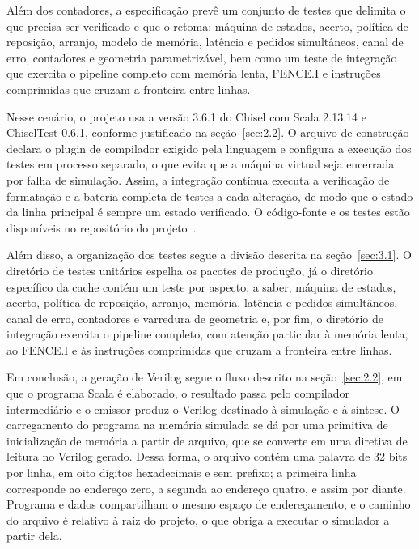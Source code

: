 Além dos contadores, a especificação prevê um conjunto de testes que delimita o que precisa ser verificado e que o  retoma: máquina de estados, acerto, política de reposição, arranjo, modelo de memória, latência e pedidos simultâneos, canal de erro, contadores e geometria parametrizável, bem como um teste de integração que exercita o pipeline completo com memória lenta, FENCE.I e instruções comprimidas que cruzam a fronteira entre linhas.

Nesse cenário, o projeto usa a versão 3.6.1 do Chisel com Scala 2.13.14 e ChiselTest 0.6.1, conforme justificado na seção~\ref{sec:2.2}. O arquivo de construção declara o plugin de compilador exigido pela linguagem e configura a execução dos testes em processo separado, o que evita que a máquina virtual seja encerrada por falha de simulação. Assim, a integração contínua executa a verificação de formatação e a bateria completa de testes a cada alteração, de modo que o estado da linha principal é sempre um estado verificado. O código-fonte e os testes estão disponíveis no repositório do projeto~\cite{melo2026riscvchisel}.

Além disso, a organização dos testes segue a divisão descrita na seção~\ref{sec:3.1}. O diretório de testes unitários espelha os pacotes de produção, já o diretório específico da cache contém um teste por aspecto, a saber, máquina de estados, acerto, política de reposição, arranjo, memória, latência e pedidos simultâneos, canal de erro, contadores e varredura de geometria e, por fim, o diretório de integração exercita o pipeline completo, com atenção particular à memória lenta, ao FENCE.I e às instruções comprimidas que cruzam a fronteira entre linhas.

Em conclusão, a geração de Verilog segue o fluxo descrito na seção~\ref{sec:2.2}, em que o programa Scala é elaborado, o resultado passa pelo compilador intermediário e o emissor produz o Verilog destinado à simulação e à síntese. O carregamento do programa na memória simulada se dá por uma primitiva de inicialização de memória a partir de arquivo, que se converte em uma diretiva de leitura no Verilog gerado. Dessa forma, o arquivo contém uma palavra de 32 bits por linha, em oito dígitos hexadecimais e sem prefixo; a primeira linha corresponde ao endereço zero, a segunda ao endereço quatro, e assim por diante. Programa e dados compartilham o mesmo espaço de endereçamento, e o caminho do arquivo é relativo à raiz do projeto, o que obriga a executar o simulador a partir dela.
